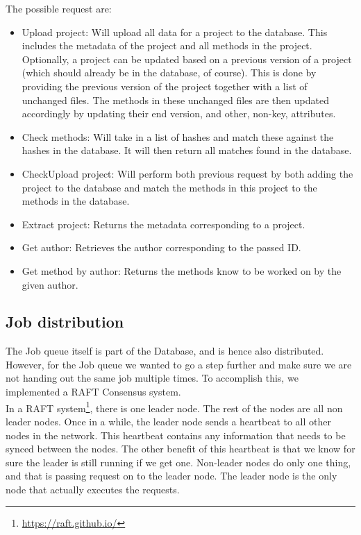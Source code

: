 \documentclass[../Main.tex]{subfiles}
\begin{document}
The possible request are:
\begin{itemize}
    \item Upload project: Will upload all data for a project to the database. This includes the metadata of the project and all methods in the project. Optionally, a project can be updated based on a previous version of a project (which should already be in the database, of course). This is done by providing the previous version of the project together with a list of unchanged files. The methods in these unchanged files are then updated accordingly by updating their end version, and other, non-key, attributes.
    \item Check methods: Will take in a list of hashes and match these against the hashes in the database. It will then return all matches found in the database.
    \item CheckUpload project: Will perform both previous request by both adding the project to the database and match the methods in this project to the methods in the database.
    \item Extract project: Returns the metadata corresponding to a project.
    \item Get author: Retrieves the author corresponding to the passed ID.
    \item Get method by author: Returns the methods know to be worked on by the given author.
\end{itemize}

\subsection{Job distribution}
The Job queue itself is part of the Database, and is hence also distributed. However, for the Job queue we wanted to go a step further and make sure we are not handing out the same job multiple times. To accomplish this, we implemented a RAFT Consensus system.\\

In a RAFT system\footnote{\url{https://raft.github.io/}},
there is one leader node. The rest of the nodes are all non leader nodes. Once in a while, the leader node sends a heartbeat to all other nodes in the network. This heartbeat contains any information that needs to be synced between the nodes. The other benefit of this heartbeat is that we know for sure the leader is still running if we get one. Non-leader nodes do only one thing, and that is passing request on to the leader node. The leader node is the only node that actually executes the requests.\\ 
\end{document}
